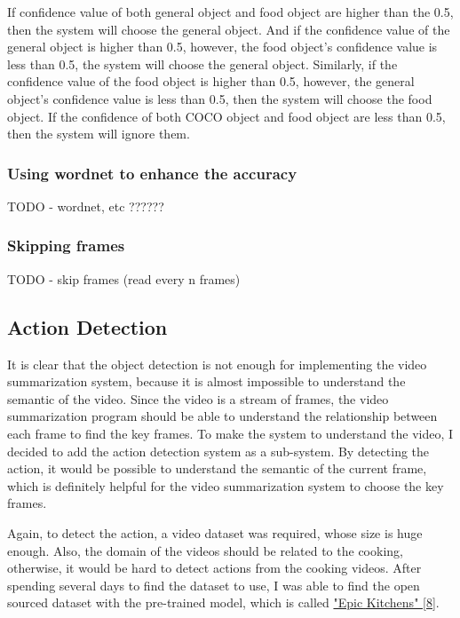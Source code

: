 \documentclass{article}
\begin{document}
If confidence value of both general object and food object are higher than the 0.5, then the system will choose the general object. And if the confidence value of the general object is higher than 0.5, however, the food object's confidence value is less than 0.5, the system will choose the general object. Similarly, if the confidence value of the food object is higher than 0.5, however, the general object's confidence value is less than 0.5, then the system will choose the food object. If the confidence of both COCO object and food object are less than 0.5, then the system will ignore them.

\subsubsection{Using wordnet to enhance the accuracy}

TODO - wordnet, etc ??????

\subsubsection{Skipping frames}

TODO - skip frames (read every n frames)

\subsection{Action Detection}

It is clear that the object detection is not enough for implementing the video summarization system, because it is almost impossible to understand the semantic of the video. Since the video is a stream of frames, the video summarization program should be able to understand the relationship between each frame to find the key frames. To make the system to understand the video, I decided to add the action detection system as a sub-system. By detecting the action, it would be possible to understand the semantic of the current frame, which is definitely helpful for the video summarization system to choose the key frames.

Again, to detect the action, a video dataset was required, whose size is huge enough. Also, the domain of the videos should be related to the cooking, otherwise, it would be hard to detect actions from the cooking videos. After spending several days to find the dataset to use, I was able to find the open sourced dataset with the pre-trained model, which is called \hyperlink{ref8}{"Epic Kitchens" [8]}.
\end{document}
